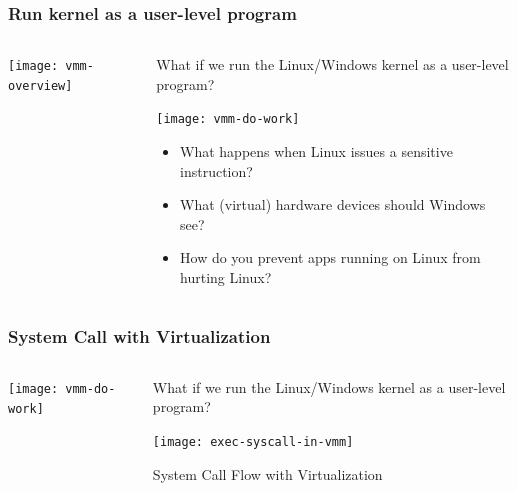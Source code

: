 \begin{frame}
	\frametitle{Run kernel as a user-level program}
	
	
	
	\begin{columns}
		
		\begin{column}{.3\textwidth}
			
			\texttt{[image: vmm-overview]}
			
		\end{column}
		
		\begin{column}{.7\textwidth}
			
			What if we run the Linux/Windows kernel as a user-level program?	
			
			\centering
			\texttt{[image: vmm-do-work]}	
			
			\begin{itemize}
				\item What happens when Linux issues a sensitive instruction?
				\item What (virtual) hardware devices should Windows see?  
				\item How do you prevent apps running on Linux from hurting Linux?
				
			\end{itemize} 
			
		\end{column}
		
		
	\end{columns}
	
	
\end{frame}


\begin{frame}
	\frametitle{System Call with Virtualization}
	
	
	
	\begin{columns}
		
		\begin{column}{.3\textwidth}
			
			\texttt{[image: vmm-do-work]}
			
		\end{column}
		
		\begin{column}{.7\textwidth}
			
			What if we run the Linux/Windows kernel as a user-level program?	
			
			\centering
			\texttt{[image: exec-syscall-in-vmm]}	
			
			System Call Flow with Virtualization
			
			
		\end{column}
		
		
	\end{columns}
	
	
\end{frame}

